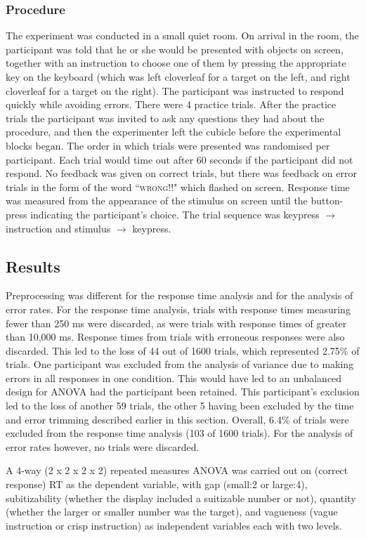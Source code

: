 \documentclass[man,floatmark]{apa}
\begin{document}
\subsubsection{Procedure}
The experiment was conducted in a small quiet room. On arrival in the room, the participant was told that he or she would be presented with objects on screen, together with an instruction to choose one of them by pressing the appropriate key on the keyboard (which was left cloverleaf for a target on the left, and right cloverleaf for a target on the right). The participant was instructed to respond quickly while avoiding errors.
There were 4 practice trials. After the practice trials the participant was invited to ask any questions they had about the procedure, and then the experimenter left the cubicle before the experimental blocks began.
The order in which trials were presented was randomised per participant. Each trial would time out after 60 seconds if the participant did not respond. No feedback was given on correct trials, but there was feedback on error trials in the form of the word ``\textsc{wrong!!}" which flashed on screen. Response time was measured from the appearance of the stimulus on screen until the button-press indicating the participant's choice. The trial sequence was keypress $\rightarrow$ instruction and stimulus $\rightarrow$ keypress.

\subsection{Results}
Preprocessing was different for the response time analysis and for the analysis of error rates. For the response time analysis, trials with response times measuring fewer than 250 ms were discarded, as were trials with response times of greater than 10,000 ms. Response times from trials with erroneous responses were also discarded.  This led to the loss of 44 out of 1600 trials, which represented 2.75\% of trials. One participant was excluded from the analysis of variance due to making errors in all responses in one condition. This would have led to an unbalanced design for ANOVA had the participant been retained. This participant's exclusion led to the loss of another 59 trials, the other 5 having been excluded by the time and error trimming described earlier in this section. Overall, 6.4\% of trials were excluded from the response time analysis (103 of 1600 trials). For the analysis of error rates however, no trials were discarded.

A 4-way (2 x 2 x 2 x 2) repeated measures ANOVA was carried out on (correct response) RT as the dependent variable, with gap (small:2 or large:4), subitizability (whether the display included a suitizable number or not), quantity (whether the larger or smaller number was the target), and vagueness  (vague instruction or crisp instruction) as independent variables each with two levels. 
\end{document}
